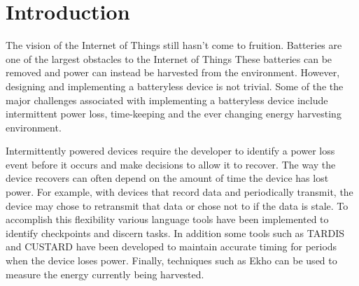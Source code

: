 \section{Introduction} %
\label{sec:introduction}

The vision of the Internet of Things still hasn't come to fruition.
Batteries are one of the largest obstacles to the Internet of Things \cite{intermittentAndAwesome}
These batteries can be removed and power can instead be harvested from the environment.
However, designing and implementing a batteryless device is not trivial.
Some of the the major challenges associated with implementing a batteryless device include intermittent power loss, time-keeping and the ever changing energy harvesting environment.

Intermittently powered devices require the developer to identify a power loss event before it occurs and make decisions to allow it to recover.
The way the device recovers can often depend on the amount of time the device has lost power.
For example, with devices that record data and periodically transmit, the device may chose to retransmit that data or chose not to if the data is stale.
To accomplish this flexibility various language tools have been implemented to identify checkpoints and discern tasks.
In addition some tools such as TARDIS \cite{tardis} and CUSTARD \cite{tardis} have been developed to maintain accurate timing for periods when the device loses power.
Finally, techniques such as Ekho \cite{ekho} can be used to measure the energy currently being harvested.

